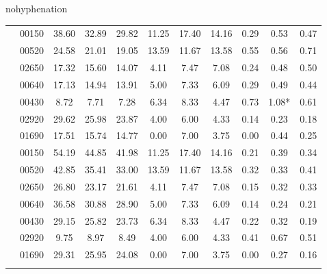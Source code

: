 \begin{hyphenrules}{nohyphenation}
\begin{table}[H]
{\begin{tabular}{>{\raggedleft\arraybackslash}p{4cm} lccCccCccc}
             & 00150 & 38.60 & 32.89 & 29.82 & 11.25 & 17.40 & 14.16 & 0.29 & 0.53 & 0.47 \\
            & 00520 &                       24.58 & 21.01 & 19.05 &     13.59 & 11.67 & 13.58 & 0.55 & 0.56 & 0.71 \\
            & 02650 &                       17.32 & 15.60 & 14.07 &     4.11 & 7.47 & 7.08 &    0.24 & 0.48 & 0.50 \\
            & 00640 &                       17.13 & 14.94 & 13.91 &     5.00 & 7.33 & 6.09 &    0.29 & 0.49 & 0.44 \\
            & 00430 &                       8.72 & 7.71 & 7.28 &        6.34 & 8.33 & 4.47 &    0.73 & 1.08* & 0.61 \\
            & 02920 &                       29.62 & 25.98 & 23.87 &     4.00 & 6.00 & 4.33 &    0.14 & 0.23 & 0.18 \\
            & 01690 &                       17.51 & 15.74 & 14.77 &     0.00 & 7.00 & 3.75 &    0.00 & 0.44 & 0.25 \\
            \midrule
            
             & 00150 & 54.19 & 44.85 & 41.98 & 11.25 & 17.40 & 14.16 & 0.21 & 0.39 & 0.34 \\
            & 00520 &                       42.85 & 35.41 & 33.00 &     13.59 & 11.67 & 13.58 & 0.32 & 0.33 & 0.41 \\
            & 02650 &                       26.80 & 23.17 & 21.61 &     4.11 & 7.47 & 7.08 &    0.15 & 0.32 & 0.33 \\
            & 00640 &                       36.58 & 30.88 & 28.90 &     5.00 & 7.33 & 6.09 &    0.14 & 0.24 & 0.21 \\
            & 00430 &                       29.15 & 25.82 & 23.73 &     6.34 & 8.33 & 4.47 &    0.22 & 0.32 & 0.19 \\
            & 02920 &                       9.75 & 8.97 & 8.49 &        4.00 & 6.00 & 4.33 &    0.41 & 0.67 & 0.51 \\
            & 01690 &                       29.31 & 25.95 & 24.08 &     0.00 & 7.00 & 3.75 &    0.00 & 0.27 & 0.16 \\
            \midrule
            

\end{tabular}}
\end{table}
\end{hyphenrules}
